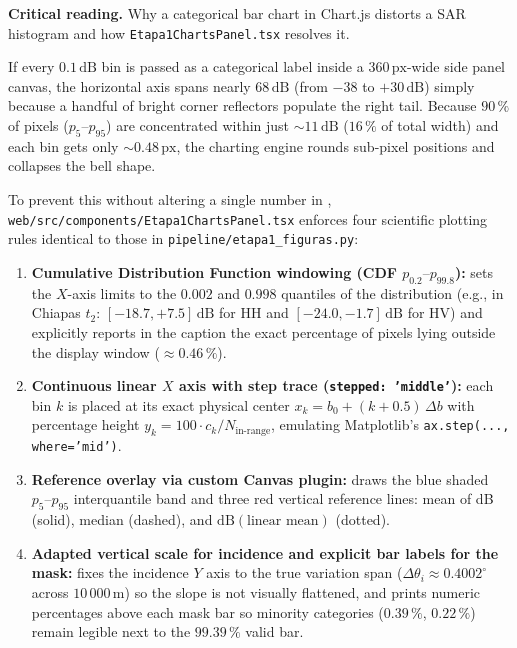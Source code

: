 \documentclass[11pt,a4paper]{article}
\newcommand{\src}[1]{\nolinkurl{#1}}
\newcommand{\unit}[1]{\mathrm{#1}}
\newcommand{\warn}[1]{\par\noindent\colorbox{blue!8}{\parbox{.965\linewidth}{\textbf{Critical reading.} #1}}\par}
\begin{document}
\begin{cuidado}
\warn{Why a categorical bar chart in Chart.js distorts a SAR histogram and how \src{Etapa1ChartsPanel.tsx}
resolves it.}
If every $0.1\,\unit{dB}$ bin is passed as a categorical label inside a $360\,\unit{px}$-wide side panel canvas,
the horizontal axis spans nearly $68\,\unit{dB}$ (from $-38$ to $+30\,\unit{dB}$) simply because a handful of
bright corner reflectors populate the right tail. Because $90\,\text{\%}$ of pixels ($p_5\text{--}p_{95}$) are
concentrated within just $\sim 11\,\unit{dB}$ ($16\,\text{\%}$ of total width) and each bin gets only
$\sim 0.48\,\unit{px}$, the charting engine rounds sub-pixel positions and collapses the bell shape.

To prevent this without altering a single number in ,
\src{web/src/components/Etapa1ChartsPanel.tsx} enforces four scientific plotting rules identical to those in
\src{pipeline/etapa1\_figuras.py}:
\begin{enumerate}
  \item \textbf{Cumulative Distribution Function windowing (CDF $p_{0.2}\text{--}p_{99.8}$):} sets the $X$-axis
        limits to the $0.002$ and $0.998$ quantiles of the distribution (e.g., in Chiapas $t_2$:
        $[-18.7, +7.5]\,\unit{dB}$ for HH and $[-24.0, -1.7]\,\unit{dB}$ for HV) and explicitly reports in the
        caption the exact percentage of pixels lying outside the display window ($\approx 0.46\,\text{\%}$).
  \item \textbf{Continuous linear $X$ axis with step trace (\texttt{stepped: 'middle'}):} each bin $k$ is placed
        at its exact physical center $x_k = b_0 + (k + 0.5)\,\Delta b$ with percentage height
        $y_k = 100 \cdot c_k / N_{\text{in-range}}$, emulating Matplotlib's \texttt{ax.step(..., where='mid')}.
  \item \textbf{Reference overlay via custom Canvas plugin:} draws the blue shaded $p_5\text{--}p_{95}$
        interquantile band and three red vertical reference lines: mean of dB (solid), median (dashed), and
        $\text{dB}(\text{linear mean})$ (dotted).
  \item \textbf{Adapted vertical scale for incidence and explicit bar labels for the mask:} fixes the incidence
        $Y$ axis to the true variation span ($\Delta\theta_i \approx 0.4002^\circ$ across $10\,000\,\unit{m}$) so
        the slope is not visually flattened, and prints numeric percentages above each mask bar so minority
        categories ($0.39\,\text{\%}$, $0.22\,\text{\%}$) remain legible next to the $99.39\,\text{\%}$ valid bar.
\end{enumerate}
\end{cuidado}
\end{document}

